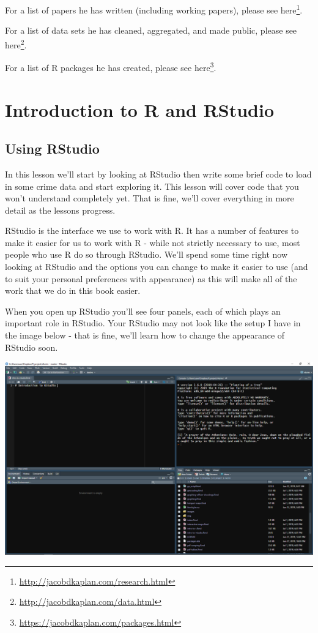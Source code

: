 \documentclass[
]{krantz}
\renewcommand{\href}[2]{#2\footnote{\url{#1}}}
\begin{document}
For a list of papers he has written (including working papers), please see \href{http://jacobdkaplan.com/research.html}{here}.

For a list of data sets he has cleaned, aggregated, and made public, please see \href{http://jacobdkaplan.com/data.html}{here}.

For a list of R packages he has created, please see \href{https://jacobdkaplan.com/packages.html}{here}.

\hypertarget{introduction-to-r-and-rstudio}{%
\chapter{Introduction to R and RStudio}\label{introduction-to-r-and-rstudio}}

\hypertarget{using-rstudio}{%
\section{Using RStudio}\label{using-rstudio}}

In this lesson we'll start by looking at RStudio then write some brief code to load in some crime data and start exploring it. This lesson will cover code that you won't understand completely yet. That is fine, we'll cover everything in more detail as the lessons progress.

RStudio is the interface we use to work with R. It has a number of features to make it easier for us to work with R - while not strictly necessary to use, most people who use R do so through RStudio. We'll spend some time right now looking at RStudio and the options you can change to make it easier to use (and to suit your personal preferences with appearance) as this will make all of the work that we do in this book easier.

When you open up RStudio you'll see four panels, each of which plays an important role in RStudio. Your RStudio may not look like the setup I have in the image below - that is fine, we'll learn how to change the appearance of RStudio soon.

\includegraphics{images/rstudio_1.PNG}
\end{document}
